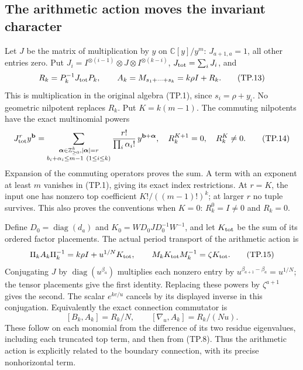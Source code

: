 \subsection{The arithmetic action moves the invariant character}

Let \(J\) be the matrix of multiplication by \(y\) on
\(\mathbb C[y]/y^m\): \(J_{a+1,a}=1\), all other entries zero.
Put \(J_i=I^{\otimes(i-1)}\otimes J\otimes I^{\otimes(k-i)}\),
\(J_{\rm tot}=\sum_iJ_i\), and
\[
 R_k=P_k^{-1}J_{\rm tot}P_k,\qquad
 A_k=M_{s_1+\cdots+s_k}=k\rho I+R_k.
 \tag{TP.13}\label{eq:tp-arithmetic}
\]
This is multiplication in the original algebra (TP.1), since
\(s_i=\rho+y_i\). No geometric nilpotent replaces \(R_k\).
Put \(K=k(m-1)\). The commuting nilpotents have the exact
multinomial powers
\[
 J_{\rm tot}^{r}y^{\mathbf b}
  =\sum_{\substack{\boldsymbol\alpha\in\mathbb Z_{\geq0}^k,
                       |\boldsymbol\alpha|=r\\
                    b_i+\alpha_i\leq m-1\ (1\leq i\leq k)}}
       \frac{r!}{\prod_i\alpha_i!}\,y^{\mathbf b+\boldsymbol\alpha},
 \quad R_k^{K+1}=0,\quad R_k^K\ne0.
 \tag{TP.14}\label{eq:tp-powers}
\]
Expansion of the commuting operators proves the sum. A term with
an exponent at least \(m\) vanishes in (TP.1), giving its exact
index restrictions. At \(r=K\), the input one has nonzero top
coefficient \(K!/((m-1)!)^k\); at larger \(r\) no tuple survives.
This also proves the conventions when \(K=0\): \(R_k^0=I\ne0\)
and \(R_k=0\).

Define \(D_0=\operatorname{diag}(d_a)\) and
\(K_0=WD_0JD_0^{-1}W^{-1}\), and let
\(K_{\rm tot}\) be the sum of its ordered factor placements.
The actual period transport of the arithmetic action is
\[
 \Pi_k A_k\Pi_k^{-1}=k\rho I+u^{1/N}K_{\rm tot},
 \qquad M_kK_{\rm tot}M_k^{-1}=\zeta K_{\rm tot}.
 \tag{TP.15}\label{eq:tp-transport}
\]
Conjugating \(J\) by \(\operatorname{diag}(u^{\beta_a})\)
multiplies each nonzero entry by
\(u^{\beta_{a+1}-\beta_a}=u^{1/N}\); the tensor placements
give the first identity. Replacing these powers by
\(\zeta^{a+1}\) gives the second. The scalar \(e^{kc/u}\)
cancels by its displayed inverse in this conjugation.
Equivalently the exact connection commutator is
\[
 [B_k,A_k]=R_k/N,\qquad [\nabla_u,A_k]=R_k/(Nu).
 \tag{TP.16}\label{eq:tp-commutator}
\]
These follow on each monomial from the difference of its two
residue eigenvalues, including each truncated top term, and then
from (TP.8). Thus the arithmetic action is explicitly related
to the boundary connection, with its precise nonhorizontal term.

